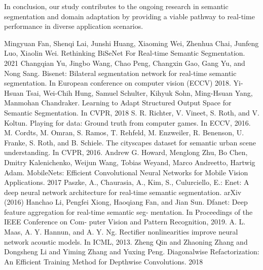 \documentclass[conference]{IEEEtran}
\begin{document}
In conclusion, our study contributes to the ongoing research in semantic segmentation and domain adaptation by providing a viable pathway to real-time performance in diverse application scenarios.
\begin{thebibliography}{00}
 Mingyuan Fan, Shenqi Lai, Junshi Huang, Xiaoming Wei, Zhenhua Chai, Junfeng Luo, Xiaolin Wei. Rethinking BiSeNet For Real-time Semantic Segmentation. 2021
 Changqian Yu, Jingbo Wang, Chao Peng, Changxin Gao, Gang Yu, and Nong Sang. Bisenet: Bilateral segmentation network for real-time semantic segmentation. In European conference on computer vision (ECCV) 2018.
 Yi-Hsuan Tsai, Wei-Chih Hung, Samuel Schulter, Kihyuk Sohn, Ming-Hsuan Yang, Manmohan Chandraker. Learning to Adapt Structured Output Space for Semantic Segmentation. In CVPR, 2018
 S. R. Richter, V. Vineet, S. Roth, and V. Koltun. Playing for data: Ground truth from computer games. In ECCV, 2016.
 M. Cordts, M. Omran, S. Ramos, T. Rehfeld, M. Enzweiler, R. Benenson, U. Franke, S. Roth, and B. Schiele. The cityscapes dataset for semantic urban scene understanding. In CVPR, 2016.
 Andrew G. Howard, Menglong Zhu, Bo Chen, Dmitry Kalenichenko, Weijun Wang, Tobias Weyand, Marco Andreetto, Hartwig Adam. MobileNets: Efficient Convolutional Neural Networks for Mobile Vision Applications. 2017
 Paszke, A., Chaurasia, A., Kim, S., Culurciello, E.: Enet: A deep neural network architecture for real-time semantic segmentation. arXiv (2016)
 Hanchao Li, Pengfei Xiong, Haoqiang Fan, and Jian Sun.
Dfanet: Deep feature aggregation for real-time semantic seg-
mentation. In Proceedings of the IEEE Conference on Com-
puter Vision and Pattern Recognition,
2019.
 A. L. Maas, A. Y. Hannun, and A. Y. Ng. Rectifier nonlinearities improve neural network acoustic models. In ICML, 2013.
 Zheng Qin and Zhaoning Zhang and Dongsheng Li and Yiming Zhang and Yuxing Peng. Diagonalwise Refactorization: An Efficient Training Method for Depthwise Convolutions. 2018
\end{thebibliography}
\vspace{12pt}
\end{document}
